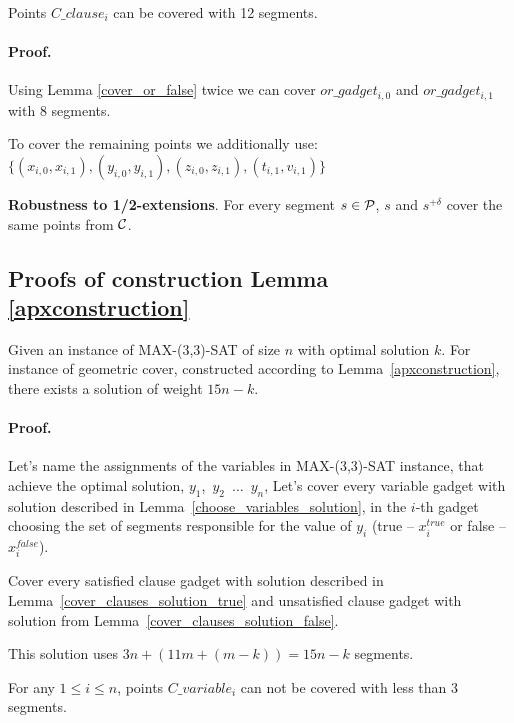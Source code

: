 \begin{lemma}
\label{cover_clauses_solution_false}
 Points $C\_clause_i$ can be covered with 12 segments.
\end{lemma}

\paragraph{Proof.}
Using Lemma \ref{cover_or_false} twice we can
cover $or\_gadget_{i,0}$ and  $or\_gadget_{i,1}$
with 8 segments.

To cover the remaining points we additionally use:
$\{ (x_{i, 0}, x_{i, 1}), (y_{i, 0}, y_{i, 1}),
(z_{i, 0}, z_{i, 1}), (t_{i, 1}, v_{i, 1}) \}$

\begin{lemma}
\textbf{Robustness to 1/2-extensions}. For every segment $s \in \mathcal{P}$,
$s$ and $s^{+\delta}$ cover the same points from $\mathcal{C}$.
\end{lemma}

\subsection{Proofs of construction Lemma \ref{apxconstruction}}
\begin{lemma}
	\label{construction_correctness}
	Given an instance of MAX-(3,3)-SAT of size $n$
	with optimal solution $k$.
	For instance of geometric cover, constructed
	according to Lemma~\ref{apxconstruction}, 
	there exists a solution of weight $15n - k$.
\end{lemma}
\paragraph{Proof.}
Let's name the assignments of the variables in MAX-(3,3)-SAT instance,
that achieve the optimal solution,
$y_1$,~$y_2$~$\ldots$~$y_n$,
Let's cover every variable gadget with solution described in
Lemma~\ref{choose_variables_solution},
in the $i$-th gadget choosing the set of segments responsible for the
value of $y_i$
(true -- $x_i^{true}$ or false -- $x_i^{false}$).

Cover every satisfied clause gadget with solution described in
Lemma~\ref{cover_clauses_solution_true}
and unsatisfied clause gadget with solution from
Lemma~\ref{cover_clauses_solution_false}.

This solution uses $3n + (11m + (m-k)) = 15n - k$ segments.


\begin{lemma}
\label{choose_variables_no_less}
For any $1 \le i \le n$, points $C\_variable_i$
can not be covered with less than 3 segments.
\end{lemma}

